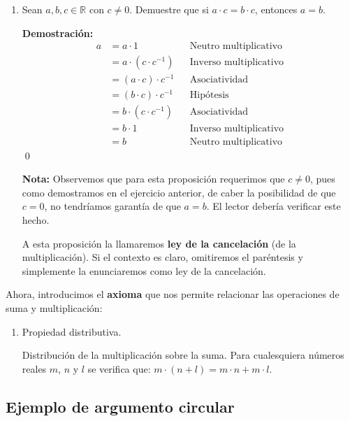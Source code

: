 \documentclass[11pt]{article}
\newcommand{\R}{\mathbb{R}}
\begin{document}
\begin{enumerate}[label=\alph*)]
        \item Sean $a,b,c\in \R$ con $c\neq 0$. Demuestre que si $a\cdot c=b\cdot c$, entonces $a=b$.
            
        \textbf{Demostración:} \begin{align*}
        a &= a\cdot 1 && \text{Neutro multiplicativo}\\
        &= a \cdot (c\cdot c^{-1}) && \text{Inverso multiplicativo}\\
        &= (a \cdot c) \cdot c^{-1} && \text{Asociatividad}\\
        &= (b \cdot c) \cdot c^{-1} && \text{Hipótesis}\\
        &= b \cdot (c\cdot c^{-1}) && \text{Asociatividad}\\
        &= b \cdot 1 && \text{Inverso multiplicativo}\\
        &= b && \text{Neutro multiplicativo}
        \end{align*} \qed
    
        \textbf{Nota:} Observemos que para esta proposición requerimos que $c\neq 0$, pues como demostramos en el ejercicio anterior, de caber la posibilidad de que $c=0$, no tendríamos garantía de que $a=b$. El lector debería verificar este hecho.%

        A esta proposición la llamaremos \textbf{ley de la cancelación} (de la multiplicación). Si el contexto es claro, omitiremos el paréntesis y simplemente la enunciaremos como ley de la cancelación.

    \end{enumerate}

    Ahora, introducimos el \textbf{axioma} que nos permite relacionar las operaciones de suma y multiplicación:

\begin{enumerate}[label=P.D.]
    \item Propiedad distributiva.
    
    Distribución de la multiplicación sobre la suma. Para cualesquiera números reales $m$, $n$ y $l$ se verifica que: $ m \cdot (n+l)=m \cdot n+m \cdot l $.
\end{enumerate}

\pagebreak

\subsection*{Ejemplo de argumento circular}
\end{document}
